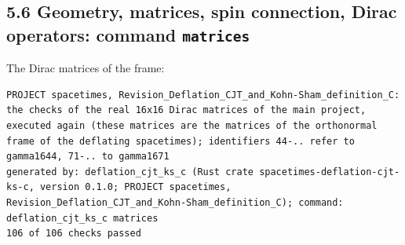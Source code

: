 \documentclass[
  10pt,
]{article}
\begin{document}
\hypertarget{geometry-matrices-spin-connection-dirac-operators-command-matrices}{%
\subsection{\texorpdfstring{5.6 Geometry, matrices, spin connection,
Dirac operators: command
\texttt{matrices}}{5.6 Geometry, matrices, spin connection, Dirac operators: command matrices}}\label{geometry-matrices-spin-connection-dirac-operators-command-matrices}}

The Dirac matrices of the frame:

\begin{verbatim}
PROJECT spacetimes, Revision_Deflation_CJT_and_Kohn-Sham_definition_C: the checks of the real 16x16 Dirac matrices of the main project, executed again (these matrices are the matrices of the orthonormal frame of the deflating spacetimes); identifiers 44-.. refer to gamma1644, 71-.. to gamma1671
generated by: deflation_cjt_ks_c (Rust crate spacetimes-deflation-cjt-ks-c, version 0.1.0; PROJECT spacetimes, Revision_Deflation_CJT_and_Kohn-Sham_definition_C); command: deflation_cjt_ks_c matrices
106 of 106 checks passed


\end{verbatim}
\end{document}
